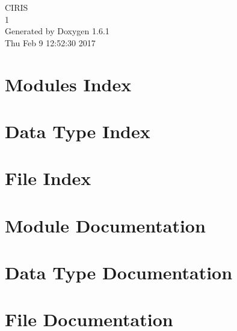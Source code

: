 \documentclass[letterpaper]{book}
\begin{document}
\hypersetup{pageanchor=false}
\begin{titlepage}
\vspace*{7cm}
\begin{center}
{\Large CIRIS \\[1ex]\large 1 }\\
\vspace*{1cm}
{\large Generated by Doxygen 1.6.1}\\
\vspace*{0.5cm}
{\small Thu Feb 9 12:52:30 2017}\\
\end{center}
\end{titlepage}
\clearemptydoublepage
{}
\tableofcontents
\clearemptydoublepage
{}
\hypersetup{pageanchor=true}
\chapter{Modules Index}

\chapter{Data Type Index}

\chapter{File Index}

\chapter{Module Documentation}











\chapter{Data Type Documentation}
















\chapter{File Documentation}


















\printindex
\end{document}
